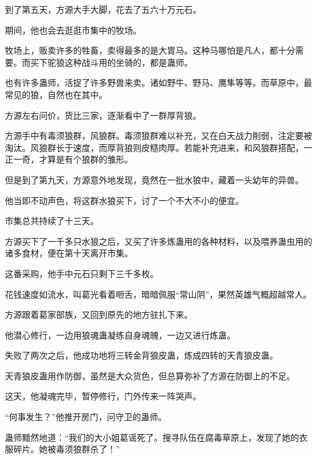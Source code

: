 \begin{this_body}
到了第五天，方源大手大脚，花去了五六十万元石。

期间，他也会去逛逛市集中的牧场。

牧场上，贩卖许多的牲畜，卖得最多的是大胃马。这种马哪怕是凡人，都十分需要。而买下驼狼这种战斗用的坐骑的，都是蛊师。

也有许多蛊师，活捉了许多野兽来卖。诸如野牛、野马、鹰隼等等。而草原中，最常见的狼，自然也在其中。

方源左右问价，货比三家，逐渐看中了一群厚背狼。

方源手中有毒须狼群，风狼群。毒须狼群难以补充，又在白天战力削弱，注定要被淘汰。风狼群长于速度，而厚背狼则皮糙肉厚。若能补充进来，和风狼群搭配，一正一奇，才算是有个狼群的雏形。

但是到了第九天，方源意外地发现，竟然在一批水狼中，藏着一头幼年的异兽。

他当即不动声色，将这群水狼买下，讨了一个不大不小的便宜。

市集总共持续了十三天。

方源买下了一千多只水狼之后，又买了许多炼蛊用的各种材料，以及喂养蛊虫用的诸多食材，便在第十天离开市集。

这番采购，他手中元石只剩下三千多枚。

花钱速度如流水，叫葛光看着咂舌，暗暗佩服“常山阴”，果然英雄气概超越常人。

方源跟着葛家部族，又回到原先的地方驻扎下来。

他潜心修行，一边用狼魂蛊凝练自身魂魄，一边又进行炼蛊。

失败了两次之后，他成功地将三转金背狼皮蛊，炼成四转的天青狼皮蛊。

天青狼皮蛊用作防御，虽然是大众货色，但总算弥补了方源在防御上的不足。

这天，他凝魂完毕，暂停修行，门外传来一阵哭声。

“何事发生？”他推开房门，问守卫的蛊师。

蛊师黯然地道：“我们的大小姐葛谣死了。搜寻队伍在腐毒草原上，发现了她的衣服碎片。她被毒须狼群杀了！”

\end{this_body}

